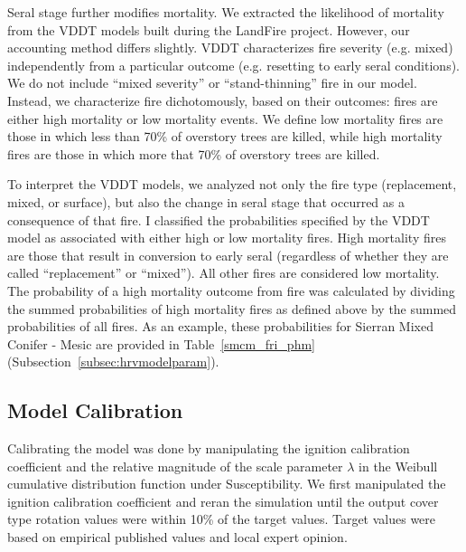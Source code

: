 \begin{itemize}
Seral stage further modifies mortality. We extracted the likelihood of mortality from the VDDT models built during the LandFire project. However, our accounting method differs slightly. VDDT characterizes fire severity (e.g. mixed) independently from a particular outcome (e.g. resetting to early seral conditions). We do not include ``mixed severity'' or ``stand-thinning'' fire \citep{Keeley2000} in our model. Instead, we characterize fire dichotomously, based on their outcomes: fires are either high mortality or low mortality events. We define low mortality fires are those in which less than 70\% of overstory trees are killed, while high mortality fires are those in which more that 70\% of overstory trees are killed. 

To interpret the VDDT models, we analyzed not only the fire type (replacement, mixed, or surface), but also the change in seral stage that occurred as a consequence of that fire. I classified the probabilities specified by the VDDT model as associated with either high or low mortality fires. High mortality fires are those that result in conversion to early seral (regardless of whether they are called ``replacement'' or ``mixed''). All other fires are considered low mortality. The probability of a high mortality outcome from fire was calculated by dividing the summed probabilities of high mortality fires as defined above by the summed probabilities of all fires. As an example, these probabilities for Sierran Mixed Conifer - Mesic are provided in Table~\ref{smcm_fri_phm} (Subsection~\ref{subsec:hrvmodelparam}).

\end{itemize}

\subsection{Model Calibration}
Calibrating the model was done by manipulating the ignition calibration coefficient and the relative magnitude of the scale parameter $\lambda$ in the Weibull cumulative distribution function under Susceptibility. We first manipulated the ignition calibration coefficient and reran the simulation until the output cover type rotation values were within 10\% of the target values. Target values were based on empirical published values and local expert opinion. 

